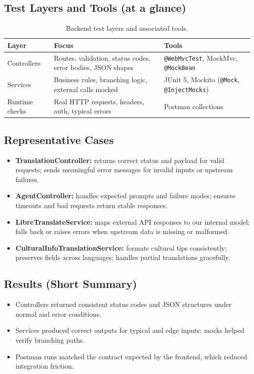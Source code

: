 \subsection{Test Layers and Tools (at a glance)}
\begin{table}[H]
\centering
\small
\begin{tabular}{p{3.2cm} p{6.8cm} p{3.2cm}}
\toprule
\textbf{Layer} & \textbf{Focus} & \textbf{Tools} \\
\midrule
Controllers & Routes, validation, status codes, error bodies, JSON shapes & \texttt{@WebMvcTest}, MockMvc, \texttt{@MockBean} \\
Services & Business rules, branching logic, external calls mocked & JUnit 5, Mockito (\texttt{@Mock}, \texttt{@InjectMocks}) \\
Runtime checks & Real HTTP requests, headers, auth, typical errors & Postman collections \\
\bottomrule
\end{tabular}
\caption{Backend test layers and associated tools.}
\label{tab:be-layers-tools}
\end{table}

\subsection{Representative Cases}
\begin{itemize} \itemsep0pt \parskip0pt
    \item \textbf{TranslationController:} returns correct status and payload for valid requests; sends meaningful error messages for invalid inputs or upstream failures.
    \item \textbf{AgentController:} handles expected prompts and failure modes; ensures timeouts and bad requests return stable responses.
    \item \textbf{LibreTranslateService:} maps external API responses to our internal model; falls back or raises errors when upstream data is missing or malformed.
    \item \textbf{CulturalInfoTranslationService:} formats cultural tips consistently; preserves fields across languages; handles partial translations gracefully.
\end{itemize}

\subsection{Results (Short Summary)}
\begin{itemize} \itemsep0pt \parskip0pt
    \item Controllers returned consistent status codes and JSON structures under normal and error conditions.
    \item Services produced correct outputs for typical and edge inputs; mocks helped verify branching paths.
    \item Postman runs matched the contract expected by the frontend, which reduced integration friction.
\end{itemize}

